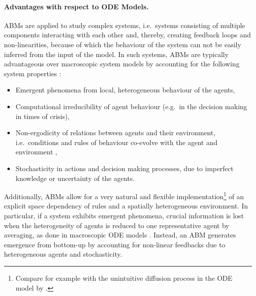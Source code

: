 \paragraph{Advantages with respect to ODE Models.}
ABMs are applied to study complex systems, i.e.\ systems consisting of multiple components interacting with each other and, thereby, creating feedback loops and non-linearities, because of which the behaviour of the system can not be easily inferred from the input of the model.
In such systems, ABMs are typically advantageous over macroscopic system models by accounting for the following system properties \citep{Bookstaber2019}:
\begin{itemize}
	\item Emergent phenomena from local, heterogeneous behaviour of the agents,
	\item Computational irreducibility of agent behaviour (e.g.\ in the decision making in times of crisis),
	\item Non-ergodicity of relations between agents and their environment, i.e.\ conditions and rules of behaviour co-evolve with the agent and environment \citep{Kohler2000},
	\item Stochasticity in actions and decision making processes, due to imperfect knowledge or uncertainty of the agents. 
\end{itemize}
Additionally, ABMs allow for a very natural and flexible implementation\footnote{Compare for example with the unintuitive diffusion process in the ODE model by \citet{Basener2011}.} of an explicit space dependency of rules and a spatially heterogeneous environment.
In particular, if a system exhibits emergent phenomena, crucial information is lost when the heterogeneity of agents is reduced to one representative agent by averaging, as done in macroscopic ODE models \citep{Bonabeau2002}.
Instead, an ABM generates emergence from bottom-up by accounting for non-linear feedbacks due to heterogeneous agents and stochasticity. %



